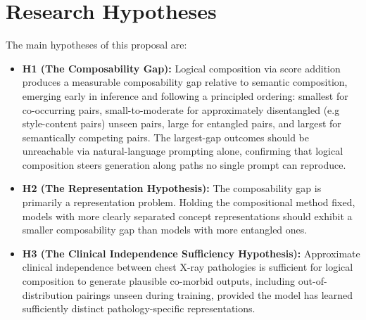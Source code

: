 
\section{Research Hypotheses}
\label{sec:research_objectives_research_hypothesis}

The main hypotheses of this proposal are:
\begin{itemize}
    \item \textbf{H1 (The Composability Gap):}
    Logical composition via score addition produces a measurable composability gap relative to semantic composition, emerging early in inference and following a principled ordering: smallest for co-occurring pairs, small-to-moderate for approximately disentangled (e.g style-content pairs) unseen pairs, large for entangled pairs, and largest for semantically competing pairs.
    The largest-gap outcomes should be unreachable via natural-language prompting alone, confirming that logical composition steers generation along paths no single prompt can reproduce.

    \item \textbf{H2 (The Representation Hypothesis):}
    The composability gap is primarily a representation problem.
    Holding the compositional method fixed, models with more clearly separated concept
    representations should exhibit a smaller composability gap than models with more entangled
    ones.

    \item \textbf{H3 (The Clinical Independence Sufficiency Hypothesis):}
    Approximate clinical independence between chest X-ray pathologies is sufficient for logical composition to generate plausible co-morbid outputs, including out-of-distribution pairings unseen during training, provided the model has learned sufficiently distinct pathology-specific representations.

\end{itemize}
